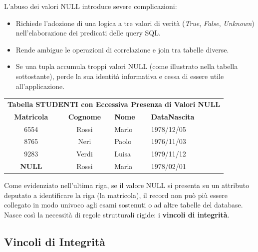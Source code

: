 \documentclass[12pt]{extarticle}
\begin{document}
\medskip
\noindent L'abuso dei valori NULL introduce severe complicazioni:
\begin{itemize}
    \item Richiede l'adozione di una logica a tre valori di verità (\textit{True}, \textit{False}, \textit{Unknown}) nell'elaborazione dei predicati delle query SQL.
    \item Rende ambigue le operazioni di correlazione e join tra tabelle diverse.
    \item Se una tupla accumula troppi valori NULL (come illustrato nella tabella sottostante), perde la sua identità informativa e cessa di essere utile all'applicazione.
\end{itemize}

\begin{center}
\small
\begin{tabular}{ccllc}
    \toprule
    \multicolumn{5}{c}{\textbf{Tabella STUDENTI con Eccessiva Presenza di Valori NULL}} \\
    \textbf{Matricola} & \textbf{Cognome} & \textbf{Nome} & \textbf{DataNascita} \\
    \midrule
    6554 & Rossi & Mario & 1978/12/05 \\
    8765 & Neri & Paolo & 1976/11/03 \\
    9283 & Verdi & Luisa & 1979/11/12 \\
    \textbf{NULL} & Rossi & Maria & 1978/02/01 \\
    \bottomrule
\end{tabular}
\end{center}

\medskip
\noindent Come evidenziato nell'ultima riga, se il valore NULL si presenta su un attributo deputato a identificare la riga (la matricola), il record non può più essere collegato in modo univoco agli esami sostenuti o ad altre tabelle del database. Nasce così la necessità di regole strutturali rigide: i \textbf{vincoli di integrità}.

\subsection{Vincoli di Integrità}
\end{document}
